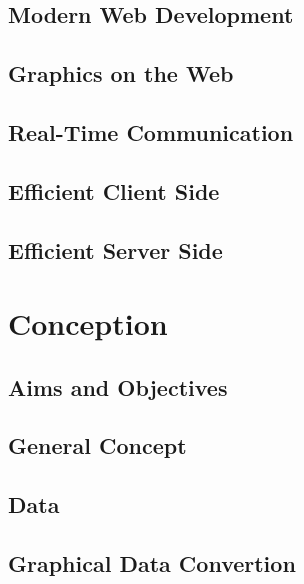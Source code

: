 \documentclass[english, BCOR=6mm, twoside=true, open=right]{tudscrreprt}
\begin{document}
\section{Modern Web Development}

\section{Graphics on the Web}

\section{Real-Time Communication}

\section{Efficient Client Side}

\section{Efficient Server Side}



\chapter{Conception}

\section{Aims and Objectives}

\section{General Concept}

\section{Data}

\section{Graphical Data Convertion}

\end{document}
